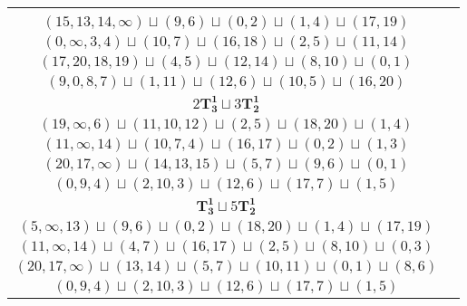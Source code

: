 \documentclass{article}
\begin{document}
\begin{longtable}{|c|c|}
\begin{tabular}{c}
        $(8,\infty,9,5)\sqcup(12,15)\sqcup(16,17)\sqcup(1,2)\sqcup(3,4)$ \\ 
        $(15,13,14,\infty)\sqcup(9,6)\sqcup(0,2)\sqcup(1,4)\sqcup(17,19)$ \\ 
        $(0,\infty,3,4)\sqcup(10,7)\sqcup(16,18)\sqcup(2,5)\sqcup(11,14)$ \\ 
        $(17,20,18,19)\sqcup(4,5)\sqcup(12,14)\sqcup(8,10)\sqcup(0,1)$ \\ 
        $(9,0,8,7)\sqcup(1,11)\sqcup(12,6)\sqcup(10,5)\sqcup(16,20)$
        \end{tabular} \\ 
        \hline
        $2\mathbf{T_{3}^{1}} \sqcup 3\mathbf{T_{2}^{1}}$ & \begin{tabular}{c}
        $(8,\infty,9)\sqcup(13,12,15)\sqcup(4,5)\sqcup(16,18)\sqcup(1,2)$ \\ 
        $(19,\infty,6)\sqcup(11,10,12)\sqcup(2,5)\sqcup(18,20)\sqcup(1,4)$ \\ 
        $(11,\infty,14)\sqcup(10,7,4)\sqcup(16,17)\sqcup(0,2)\sqcup(1,3)$ \\ 
        $(20,17,\infty)\sqcup(14,13,15)\sqcup(5,7)\sqcup(9,6)\sqcup(0,1)$ \\ 
        $(0,9,4)\sqcup(2,10,3)\sqcup(12,6)\sqcup(17,7)\sqcup(1,5)$
        \end{tabular} \\ 
        \hline
        $\mathbf{T_{3}^{1}} \sqcup 5\mathbf{T_{2}^{1}}$ & \begin{tabular}{c}
        $(8,\infty,9)\sqcup(12,15)\sqcup(4,5)\sqcup(16,18)\sqcup(1,2)\sqcup(19,20)$ \\ 
        $(5,\infty,13)\sqcup(9,6)\sqcup(0,2)\sqcup(18,20)\sqcup(1,4)\sqcup(17,19)$ \\ 
        $(11,\infty,14)\sqcup(4,7)\sqcup(16,17)\sqcup(2,5)\sqcup(8,10)\sqcup(0,3)$ \\ 
        $(20,17,\infty)\sqcup(13,14)\sqcup(5,7)\sqcup(10,11)\sqcup(0,1)\sqcup(8,6)$ \\ 
        $(0,9,4)\sqcup(2,10,3)\sqcup(12,6)\sqcup(17,7)\sqcup(1,5)$
        \end{tabular} \\ 
        \hline
    \end{longtable}

    \label{fig:1rot123chart}
    \vspace{-4mm}
    \begin{center}
    \end{center}
    
    
\end{document}
